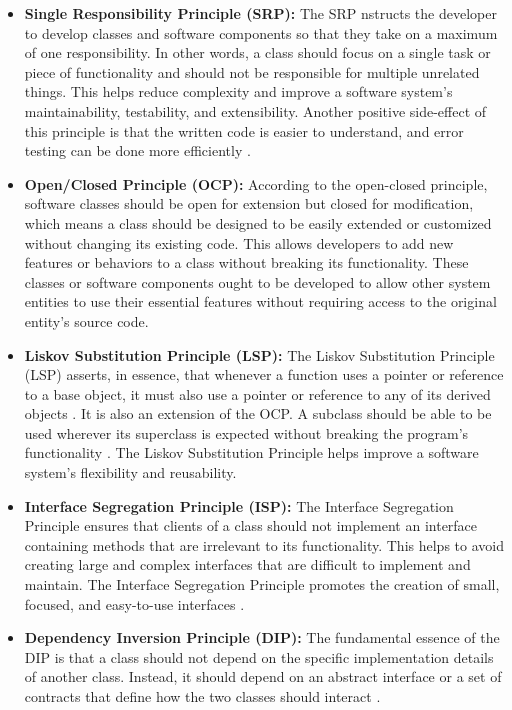 \begin{itemize}
	\item \textbf{Single Responsibility Principle (SRP):}
	The SRP nstructs the developer to develop classes and software components so that they take on a maximum of one responsibility. In other words, a class should focus on a single task or piece of functionality and should not be responsible for multiple unrelated things. This helps reduce complexity and improve a software system's maintainability, testability, and extensibility. Another positive side-effect of this principle is that the written code is easier to understand, and error testing can be done more efficiently \cite{.martin}.
	
	\item \textbf{Open/Closed Principle (OCP):}
	According to the open-closed principle, software classes should be open for extension but closed for modification, which means a class should be designed to be easily extended or customized without changing its existing code. This allows developers to add new features or behaviors to a class without breaking its functionality. These classes or software components ought to be developed to allow other system entities to use their essential features without requiring access to the original entity's source code. 
	
	\item \textbf{Liskov Substitution Principle (LSP):}
	The Liskov Substitution Principle (LSP) asserts, in essence, that whenever a function uses a pointer or reference to a base object, it must also use a pointer or reference to any of its derived objects \cite{principles}. It is also an extension of the OCP. A subclass should be able to be used wherever its superclass is expected without breaking the program's functionality \cite{stackify}. The Liskov Substitution Principle helps improve a software system's flexibility and reusability.
	
	\item \textbf{Interface Segregation Principle (ISP):}
	The Interface Segregation Principle ensures that clients of a class should not implement an interface containing methods that are irrelevant to its functionality. This helps to avoid creating large and complex interfaces that are difficult to implement and maintain. The Interface Segregation Principle promotes the creation of small, focused, and easy-to-use interfaces \cite{principles} \cite{.martin}. 
	
	\item \textbf{Dependency Inversion Principle (DIP):}
	The fundamental essence of the DIP is that a class should not depend on the specific implementation details of another class. Instead, it should depend on an abstract interface or a set of contracts that define how the two classes should interact \cite{principles}.
\end{itemize}



